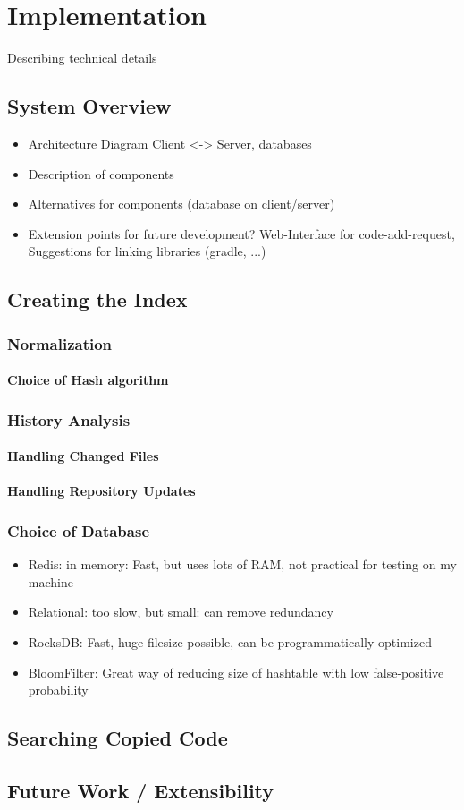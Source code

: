 
\chapter{Implementation}\label{chapter:implementation}
Describing technical details %

\section{System Overview}
\begin{itemize}
    \item Architecture Diagram Client <-> Server, databases
    \item Description of components
    \item Alternatives for components (database on client/server)
    \item Extension points for future development? Web-Interface for code-add-request, Suggestions for linking libraries (gradle, ...)
\end{itemize}
\section{Creating the Index}
\subsection{Normalization}
\subsubsection{Choice of Hash algorithm}
\subsection{History Analysis}
\subsubsection{Handling Changed Files}
\subsubsection{Handling Repository Updates}
\subsection{Choice of Database}
\begin{itemize}
    \item Redis: in memory: Fast, but uses lots of RAM, not practical for testing on my machine
    \item Relational: too slow, but small: can remove redundancy
    \item RocksDB: Fast, huge filesize possible, can be programmatically optimized
    \item BloomFilter: Great way of reducing size of hashtable with low false-positive probability %
\end{itemize}
\section{Searching Copied Code}
\section{Future Work / Extensibility}